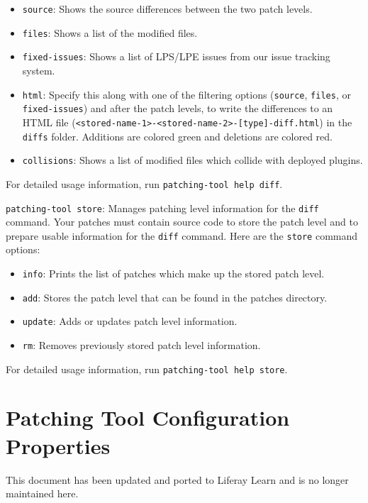 \begin{itemize}
\tightlist
\item
  \texttt{source}: Shows the source differences between the two patch
  levels.
\item
  \texttt{files}: Shows a list of the modified files.
\item
  \texttt{fixed-issues}: Shows a list of LPS/LPE issues from our issue
  tracking system.
\item
  \texttt{html}: Specify this along with one of the filtering options
  (\texttt{source}, \texttt{files}, or \texttt{fixed-issues}) and after
  the patch levels, to write the differences to an HTML file
  (\texttt{\textless{}stored-name-1\textgreater{}-\textless{}stored-name-2\textgreater{}-{[}type{]}-diff.html})
  in the \texttt{diffs} folder. Additions are colored green and
  deletions are colored red.
\item
  \texttt{collisions}: Shows a list of modified files which collide with
  deployed plugins.
\end{itemize}

For detailed usage information, run \texttt{patching-tool\ help\ diff}.

\texttt{patching-tool\ store}: Manages patching level information for
the \texttt{diff} command. Your patches must contain source code to
store the patch level and to prepare usable information for the
\texttt{diff} command. Here are the \texttt{store} command options:

\begin{itemize}
\tightlist
\item
  \texttt{info}: Prints the list of patches which make up the stored
  patch level.
\item
  \texttt{add}: Stores the patch level that can be found in the patches
  directory.
\item
  \texttt{update}: Adds or updates patch level information.
\item
  \texttt{rm}: Removes previously stored patch level information.
\end{itemize}

For detailed usage information, run \texttt{patching-tool\ help\ store}.

\chapter{Patching Tool Configuration
Properties}\label{patching-tool-configuration-properties}

{This document has been updated and ported to Liferay Learn and is no
longer maintained here.}

